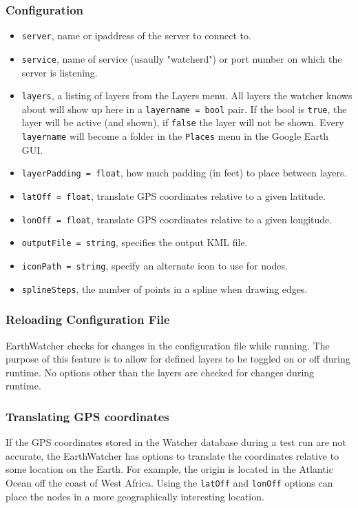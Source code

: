 \subsubsection{Configuration}
\begin{itemize}
\item {\tt server}, name or ipaddress of the server to connect to.
\item {\tt service}, name of service (usaully "watcherd") or port number on which the server is listening.
\item {\tt layers}, a listing of layers from the Layers menu. All layers the watcher knows about will show up here in a {\tt layername = bool} pair. 
If the bool is {\tt true}, the layer will be active (and shown), if {\tt false} the layer will not be shown. Every {\tt layername} will become
a folder in the {\tt Places} menu in the Google Earth GUI.
\item {\tt layerPadding = float}, how much padding (in feet) to place between layers. 
\item {\tt latOff = float}, translate GPS coordinates relative to a given latitude.
\item {\tt lonOff = float}, translate GPS coordinates relative to a given longitude.
\item {\tt outputFile = string}, specifies the output KML file.
\item {\tt iconPath = string}, specify an alternate icon to use for nodes.
\item {\tt splineSteps}, the number of points in a spline when drawing edges.
\end{itemize}

\subsubsection{Reloading Configuration File}

EarthWatcher checks for changes in the configuration file while running.  The purpose of this feature is to allow for
defined layers to be toggled on or off during runtime.  No options other than the layers are checked for changes during runtime.

\subsubsection{Translating GPS coordinates}

If the GPS coordinates stored in the Watcher database during a test run are not
accurate, the EarthWatcher has options to translate the coordinates relative to
some location on the Earth.  For example, the origin is located in the Atlantic
Ocean off the coast of West Africa.  Using the {\tt latOff} and {\tt lonOff}
options can place the nodes in a more geographically interesting location.

